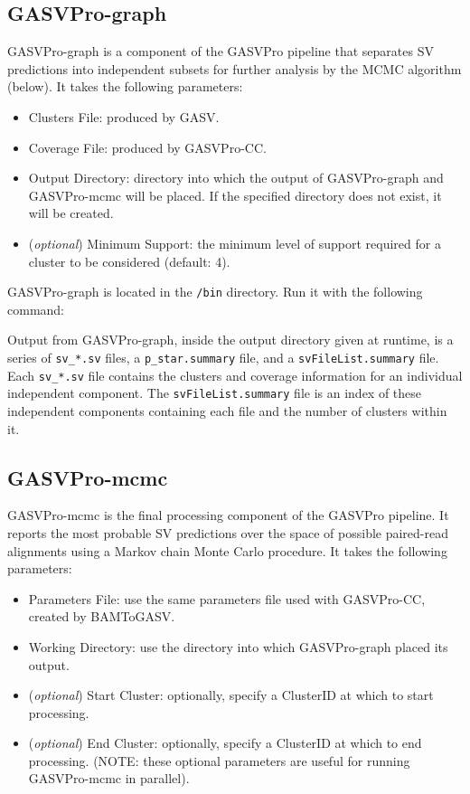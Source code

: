 \documentclass[11pt]{article}
\begin{document}
\subsection{GASVPro-graph}
GASVPro-graph is a component of the GASVPro pipeline that separates SV predictions into independent subsets for further analysis by the MCMC algorithm (below). It takes the following parameters:
\begin{itemize}
	\item Clusters File: produced by GASV. 
	\item Coverage File: produced by GASVPro-CC. 
	\item Output Directory: directory into which the output of GASVPro-graph and GASVPro-mcmc will be placed. If the specified directory does not exist, it will be created. 
	\item (\textit{optional}) Minimum Support: the minimum level of support required for a cluster to be considered (default: 4).
\end{itemize}

\noindent GASVPro-graph is located in the \verb+/bin+ directory. Run it with the following command:
\begin{framed}
\end{framed}

Output from GASVPro-graph, inside the output directory given at runtime, is a series of \verb+sv_*.sv+ files, a \verb+p_star.summary+ file, and a \verb+svFileList.summary+ file. Each \verb+sv_*.sv+ file contains the clusters and coverage information for an individual independent component. The \verb+svFileList.summary+ file is an index of these independent components containing each file and the number of clusters within it.

\subsection{GASVPro-mcmc}
GASVPro-mcmc is the final processing component of the GASVPro pipeline. It reports the most probable SV predictions over the space of possible paired-read alignments using a Markov chain Monte Carlo procedure. It takes the following parameters:
\begin{itemize}
	\item Parameters File: use the same parameters file used with GASVPro-CC, created by BAMToGASV.
	\item Working Directory: use the directory into which GASVPro-graph placed its output.
	\item ({\em optional}) Start Cluster: optionally, specify a ClusterID at which to start processing.
	\item ({\em optional}) End Cluster: optionally, specify a ClusterID at which to end processing. ({\small NOTE: these optional parameters are useful for running GASVPro-mcmc in parallel}).
\end{itemize}
\end{document}

